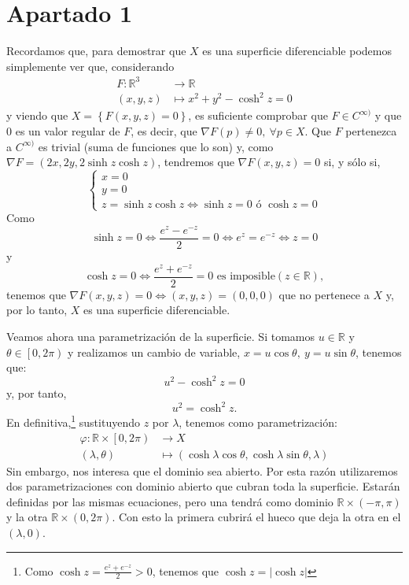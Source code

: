 \section{Apartado 1}
Recordamos que, para demostrar que $X$ es una superficie diferenciable podemos
simplemente ver que, considerando
\begin{align*}
    F: \mathbb{R}^3 &\rightarrow \mathbb{R}\\
    \left( x, y, z \right) &\mapsto x^2 + y^2 - \cosh^2z = 0
\end{align*}
y viendo que $X = \left\{ F\left( x, y, z \right) = 0 \right\}$, es suficiente
comprobar que $F \in C^{\infty)}$ y que $0$ es un valor regular de $F$, es
decir, que $\nabla F\left( p \right) \neq 0,\ \forall p \in X$. Que $F$
pertenezca a $C^{\infty)}$ es trivial (suma de funciones que lo son) y, como
$\nabla F = \left( 2x, 2y, 2\sinh z \cosh z \right)$, tendremos que $\nabla
F\left( x, y, z \right) = 0$ si, y sólo si,
\[
    \begin{cases}
        x = 0\\
        y = 0\\
        z = \sinh z \cosh z \Leftrightarrow \sinh z = 0 \text{ ó } \cosh z = 0
    \end{cases}
\]
Como 
\[
\sinh z = 0 \Leftrightarrow \frac{e^z - e^{-z}}{2} = 0 \Leftrightarrow e^z =
e^{-z} \Leftrightarrow z = 0
\]
y
\[
\cosh z = 0 \Leftrightarrow \frac{e^z + e^{-z}}{2} = 0 \text{ es imposible}
\left( z \in \mathbb{R} \right),
\]
tenemos que $\nabla F\left( x, y, z \right) = 0 \Leftrightarrow \left( x, y, z
\right) = \left( 0, 0, 0 \right)$ que no pertenece a $X$ y, por lo tanto, $X$ es una superficie
diferenciable.

Veamos ahora una parametrización de la superficie. Si tomamos $u \in \mathbb{R}$
y $\theta \in \left[ 0, 2 \pi \right)$ y realizamos un cambio de variable, $x =
u \cos \theta,\ y = u \sin \theta$, tenemos que:
\[
u^2 - \cosh^2 z = 0
\]
y, por tanto,
\[
u^2 = \cosh^2 z.
\]
En definitiva,\footnote{Como $\cosh z = \frac{e^z + e^{-z}}{2} > 0$, tenemos que
$\cosh z = \left\lvert \cosh z \right\rvert$} sustituyendo $z$ por $\lambda$,
tenemos como parametrización: 
\begin{align*}
    \varphi: \mathbb{R} \times \left[ 0, 2 \pi \right) &\rightarrow X\\
    \left( \lambda, \theta \right) &\mapsto \left( \cosh \lambda \cos \theta, \cosh
    \lambda \sin \theta, \lambda \right)
\end{align*}
Sin embargo, nos interesa que el dominio sea abierto. Por esta razón
utilizaremos dos parametrizaciones con dominio abierto que cubran toda la
superficie. Estarán definidas por las mismas ecuaciones, pero una tendrá como
dominio $\mathbb{R} \times \left( -\pi, \pi \right)$ y la otra $\mathbb{R}
\times \left( 0, 2 \pi \right) $. Con esto la primera cubrirá el hueco que deja
la otra en el $\left( \lambda, 0 \right)$.


